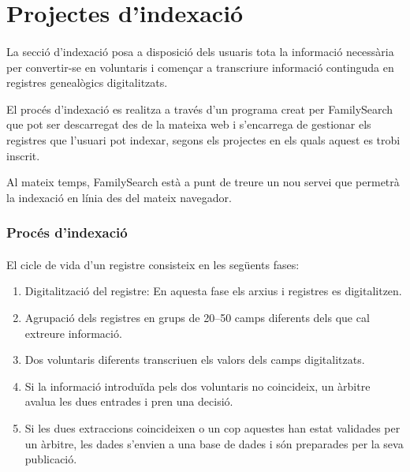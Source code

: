 \section{Projectes d'indexació}

    \paragraph{}
    La secció d’indexació posa a disposició dels usuaris tota la informació necessària per convertir-se en voluntaris i començar a transcriure informació continguda en registres genealògics digitalitzats.

    El procés d’indexació es realitza a través d’un programa creat per FamilySearch que pot ser descarregat des de la mateixa web i s’encarrega de gestionar els registres que l’usuari pot indexar, segons els projectes en els quals aquest es trobi inscrit.

    Al mateix temps, FamilySearch està a punt de treure un nou servei que permetrà la indexació en línia des del mateix navegador.


    \subsubsection{Procés d'indexació}

        \paragraph{}
        El cicle de vida d’un registre consisteix en les següents fases:

        \begin{enumerate}
            \item Digitalització del registre: En aquesta fase els arxius i registres es digitalitzen.
            \item Agrupació dels registres en grups de 20--50 camps diferents dels que cal extreure informació.
            \item Dos voluntaris diferents transcriuen els valors dels camps digitalitzats.
            \item Si la informació introduïda pels dos voluntaris no coincideix, un àrbitre avalua les dues entrades i pren una decisió.
            \item Si les dues extraccions coincideixen o un cop aquestes han estat validades per un àrbitre, les dades s’envien a una base de dades i són preparades per la seva publicació.
        \end{enumerate}

